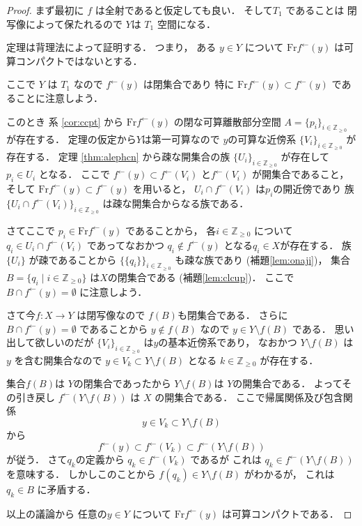 \documentclass[leqno, a4paper, 12pt]{jsarticle}
\newcommand{\zz}{\mathbb{Z}}
\newcommand{\bound}{\mathrm{Fr}}
\newcommand{\myinv}[1]{#1^{\gets}}
\begin{document}
\begin{proof}
まず最初に
$f$
は全射であると仮定しても良い．
そして$T_{1}$
であることは
閉写像によって保たれるので
$Y$は
$T_{1}$
空間になる．

定理は背理法によって証明する．
つまり，
ある
$y\in Y$
について
$\bound \myinv{f}(y)$
は可算コンパクトではないとする．

ここで
$Y$
は
$T_{1}$
なので
$\myinv{f}(y)$
は閉集合であり
特に
$\bound \myinv{f}(y)\subset \myinv{f}(y)$
であることに注意しよう．





このとき
系
\ref{cor:ccpt}
から
$\bound \myinv{f}(y)$
の閉な可算離散部分空間
$A=\{p_{i}\}_{i\in \zz_{\ge 0}}$
が存在する．
定理の仮定から$Y$は第一可算なので
$y$の可算な近傍系
$\{V_{i}\}_{i\in \zz_{\ge 0}}$
が存在する．
定理
\ref{thm:alephcn}
から疎な開集合の族
$\{U_{i}\}_{i\in \zz_{\ge 0}}$
が存在して
$p_{i}\in U_{i}$
となる．
ここで
$\myinv{f}(y)\subset \myinv{f}(V_{i})$
と$\myinv{f}(V_{i})$
が開集合であること，
そして
$\bound \myinv{f}(y)\subset \myinv{f}(y)$
を用いると，
$U_{i}\cap \myinv{f}(V_{i})$
は$p_{i}$の開近傍であり
族
$\{U_{i}\cap \myinv{f}(V_{i})\}_{i\in \zz_{\ge 0}}$
は疎な開集合からなる族である．



さてここで
$p_{i}\in \bound \myinv{f}(y)$
であることから，
各$i\in \zz_{\ge 0}$
について
$q_{i}\in U_{i}\cap \myinv{f}(V_{i})$
であってなおかつ
$q_{i}\not \in \myinv{f}(y)$
となる$q_{i}\in X$が存在する．
族$\{U_{i}\}$
が疎であることから
$\{\{q_{i}\}\}_{i\in \zz_{\ge 0}}$
も疎な族であり
(補題\ref{lem:onaji})，
集合$B=\{q_{i}\mid i\in \zz_{\ge 0}\}$
は$X$の閉集合である
(補題\ref{lem:clcup})．
ここで$B\cap \myinv{f}(y)=\emptyset$
に注意しよう．

さて今$f\colon X\to Y$
は閉写像なので
$f(B)$も閉集合である．
さらに$B\cap \myinv{f}(y)=\emptyset$
であることから
$y\not \in f(B)$
なので
$y\in Y\setminus f(B)$
である．
思い出して欲しいのだが
$\{V_{i}\}_{i\in \zz_{\ge 0}}$
は$y$の基本近傍系であり，
なおかつ
$Y\setminus f(B)$
は
$y$
を含む開集合なので
$y\in V_{k}\subset Y\setminus f(B)$
となる
$k\in \zz_{\ge 0}$
が存在する．




集合$f(B)$は
$Y$の閉集合であったから
$Y\setminus f(B)$は
$Y$の開集合である．
よってその引き戻し
$\myinv{f}(Y\setminus f(B))$
は
$X$
の開集合である．
ここで帰属関係及び包含関係
\[
y\in V_{k}\subset Y\setminus f(B)
\]
から
\[\myinv{f}(y)\subset \myinv{f}(V_{k})\subset \myinv{f}(Y\setminus f(B))
\]
が従う．
さて$q_{k}$の定義から
$q_{k}\in \myinv{f}(V_{k})$
であるが
これは
$q_{k}\in \myinv{f}(Y\setminus f(B))$
を意味する．
しかしこのことから
$f(q_{k})\in Y\setminus f(B)$
がわかるが，
これは
$q_{k}\in B$
に矛盾する．

以上の議論から
任意の$y\in Y$
について
$\bound \myinv{f}(y)$
は可算コンパクトである．
\end{proof}
\end{document}
